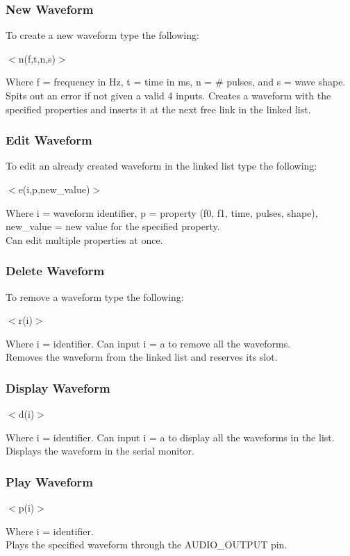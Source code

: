 \documentclass[12pt, a4paper]{article}
\begin{document}
\subsubsection{New Waveform}
To create a new waveform type the following:
\begin{center}
	$<$n(f,t,n,s)$>$
\end{center} 
Where f = frequency in Hz, t = time in ms, n = \# pulses, and s = wave shape.\\
Spits out an error if not given a valid 4 inputs. Creates a waveform with the specified properties and inserts it at the next free link in the linked list.
\subsubsection{Edit Waveform}
To edit an already created waveform in the linked list type the following: \\
\begin{center}
	$<$e(i,p,new\_value)$>$
\end{center}
Where i = waveform identifier, p = property (f0, f1, time, pulses, shape), new\_value = new value for the specified property. \\

Can edit multiple properties at once.
\subsubsection{Delete Waveform}
To remove a waveform type the following: \\
\begin{center}
	$<$r(i)$>$
\end{center}
Where i = identifier. Can input i = a to remove all the waveforms. \\
Removes the waveform from the linked list and reserves its slot. 
\subsubsection{Display Waveform}
\begin{center}
	$<$d(i)$>$
\end{center}
Where i = identifier. Can input i = a to display all the waveforms in the list. \\
Displays the waveform in the serial monitor. 
\subsubsection{Play Waveform}
\begin{center}
	$<$p(i)$>$
\end{center}
Where i = identifier. \\
Plays the specified waveform through the AUDIO\_OUTPUT pin. 
\end{document}

